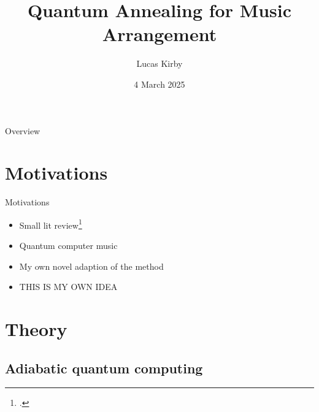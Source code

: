 \documentclass[handout]{beamer}
\title{Quantum Annealing for Music Arrangement}
\author{Lucas Kirby}
\institute{Department of Physics, Durham University}
\date{4 March 2025}
\begin{document}
\begin{frame}
    \titlepage
\end{frame}

\begin{frame}{Overview}
    \tableofcontents

\end{frame}

\section{Motivations}

\begin{frame}{Motivations}
    
    \begin{itemize}
        \item Small lit review\footcite{cambouropoulos_lbdm_2011}
        \item Quantum computer music
        \item My own novel adaption of the method
        \item THIS IS MY OWN IDEA
    \end{itemize}
    
\end{frame}

\section{Theory} %

\subsection{Adiabatic quantum computing}
\end{document}

